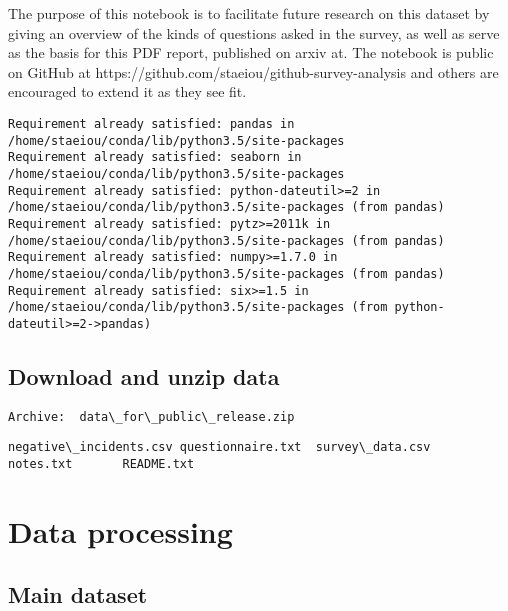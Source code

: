 \documentclass[11pt]{article}
\begin{document}
The purpose of this notebook is to facilitate future research on this
dataset by giving an overview of the kinds of questions asked in the
survey, as well as serve as the basis for this PDF report, published on
arxiv at. The notebook is public on GitHub at
https://github.com/staeiou/github-survey-analysis and others are
encouraged to extend it as they see fit.


    \begin{Verbatim}[commandchars=\\\{\}]
Requirement already satisfied: pandas in /home/staeiou/conda/lib/python3.5/site-packages
Requirement already satisfied: seaborn in /home/staeiou/conda/lib/python3.5/site-packages
Requirement already satisfied: python-dateutil>=2 in /home/staeiou/conda/lib/python3.5/site-packages (from pandas)
Requirement already satisfied: pytz>=2011k in /home/staeiou/conda/lib/python3.5/site-packages (from pandas)
Requirement already satisfied: numpy>=1.7.0 in /home/staeiou/conda/lib/python3.5/site-packages (from pandas)
Requirement already satisfied: six>=1.5 in /home/staeiou/conda/lib/python3.5/site-packages (from python-dateutil>=2->pandas)

    \end{Verbatim}



    \subsection{Download and unzip data}\label{download-and-unzip-data}


    \begin{Verbatim}[commandchars=\\\{\}]
Archive:  data\_for\_public\_release.zip

    \end{Verbatim}


    \begin{Verbatim}[commandchars=\\\{\}]
negative\_incidents.csv	questionnaire.txt  survey\_data.csv
notes.txt		README.txt

    \end{Verbatim}

    \section{Data processing}\label{data-processing}

\subsection{Main dataset}\label{main-dataset}
\end{document}
